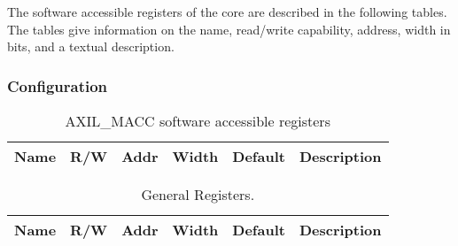 
The software accessible registers of the core are described in the following
tables. The tables give information on the name, read/write capability, address, width in bits, and a textual description.
\subsubsection{ Configuration}
\begin{table}[H]
  \centering
  \begin{tabularx}{\textwidth}{|l|c|c|c|c|X|}

    \hline
    \rowcolor{iob-green}
    {\bf Name} & {\bf R/W} & {\bf Addr} & {\bf Width} & {\bf Default} & {\bf Description} \\ \hline

    

  \end{tabularx}
  \caption{AXIL\_MACC software accessible registers}
  \label{_axil_macc_csrs_tab:is}
\end{table}

\begin{table}[H]
  \centering
  \begin{tabularx}{\textwidth}{|l|c|c|c|c|X|}

    \hline
    \rowcolor{iob-green}
    {\bf Name} & {\bf R/W} & {\bf Addr} & {\bf Width} & {\bf Default} & {\bf Description} \\ \hline

    

  \end{tabularx}
  \caption{General Registers.}
  \label{_general_operation_csrs_tab:is}
\end{table}
\clearpage